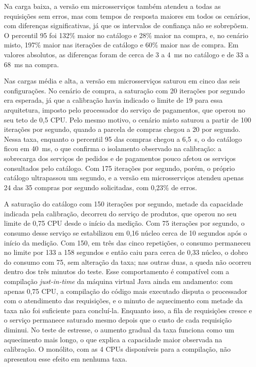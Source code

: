 Na carga baixa, a versão em microsserviços também atendeu a todas as requisições sem erros, mas
com tempos de resposta maiores em todos os cenários, com diferenças significativas, já que os
intervalos de confiança não se sobrepõem. O percentil 95 foi 132\% maior no catálogo e 28\%
maior na compra, e, no cenário misto, 197\% maior nas iterações de catálogo e 60\% maior nas de
compra. Em valores absolutos, as diferenças foram de cerca de 3 a 4~ms no catálogo e de 33 a
68~ms na compra.

Nas cargas média e alta, a versão em microsserviços saturou em cinco das seis configurações. No
cenário de compra, a saturação com 20 iterações por segundo era esperada, já que a calibração
havia indicado o limite de 19 para essa arquitetura, imposto pelo processador do serviço de
pagamentos, que operou no seu teto de 0,5 CPU. Pelo mesmo motivo, o cenário misto saturou a
partir de 100 iterações por segundo, quando a parcela de compras chegou a 20 por segundo. Nessa
taxa, enquanto o percentil 95 das compras chegou a 6,5~s, o do catálogo ficou em 40~ms, o que
confirma o isolamento observado na calibração: a sobrecarga dos serviços de pedidos e de
pagamentos pouco afetou os serviços consultados pelo catálogo. Com 175 iterações por segundo,
porém, o próprio catálogo ultrapassou um segundo, e a versão em microsserviços atendeu apenas 24
das 35 compras por segundo solicitadas, com 0,23\% de erros.

A saturação do catálogo com 150 iterações por segundo, metade da capacidade indicada pela
calibração, decorreu do serviço de produtos, que operou no seu limite de 0,75 CPU desde o
início da medição. Com 75 iterações por segundo, o consumo desse serviço se estabilizou em
0,16 núcleo cerca de 10 segundos após o início da medição. Com 150, em três das cinco
repetições, o consumo permaneceu no limite por 133 a 158 segundos e então caiu para cerca de
0,33 núcleo, o dobro do consumo com 75, sem alteração da taxa; nas outras duas, a queda não
ocorreu dentro dos três minutos do teste. Esse comportamento é compatível com a compilação
\textit{just-in-time} da máquina virtual Java ainda em andamento: com apenas 0,75 CPU, a
compilação do código mais executado disputa o processador com o atendimento das requisições, e
o minuto de aquecimento com metade da taxa não foi suficiente para concluí-la. Enquanto isso, a
fila de requisições cresce e o serviço permanece saturado mesmo depois que o custo de cada
requisição diminui. No teste de estresse, o aumento gradual da taxa funciona como um aquecimento
mais longo, o que explica a capacidade maior observada na calibração. O monólito, com as 4 CPUs
disponíveis para a compilação, não apresentou esse efeito em nenhuma taxa.

